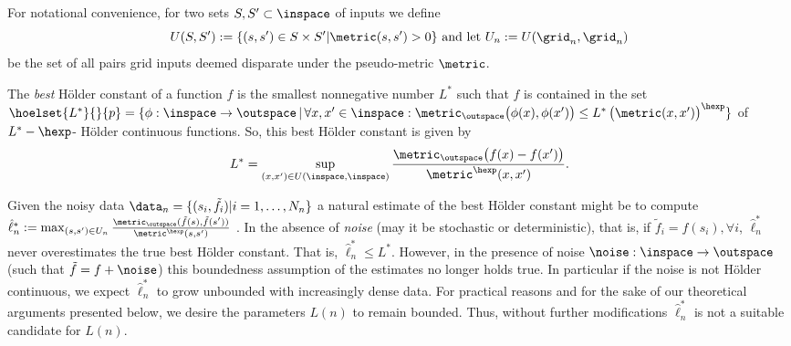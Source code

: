 For notational convenience, for two sets $S,S' \subset \inspace$ of inputs we define  $$U(S,S') := \{(s,s') \in S \times S' | \metric(s,s') >0\} \text{ and  let } U_n := U(\grid_n,\grid_n) $$ be the set of all pairs grid inputs deemed disparate under the pseudo-metric $\metric$.

The \emph{best} H\"older constant of a function $f$ is the smallest nonnegative number $L^*$ such that $f$ is contained in the set 
$\hoelset {L^*}{}{p} = \{\phi: \inspace \to \outspace \, \vert \, \forall x,x' \in \inspace : \metric_\outspace \bigl(\phi(x),\phi(x')\bigr) \leq L^* \, \bigl( \metric (x,x') \bigr)^\hexp\} $ of $L^*-\hexp$- H\"older continuous functions. So, this best H\"older constant is given by  
%
$$L^* = \sup_{(x,x') \in U(\inspace,\inspace)} \frac{\metric_\outspace \bigl(f(x) - f(x')\bigr)}{\metric^\hexp(x,x') }.$$




Given the noisy data $\data_n = \{(s_i,\tilde f_i) | i=1,\ldots,N_n\}$ a natural estimate of the best H\"older constant might be to compute $\hat \ell_n^* := \max_{(s,s') \in U_n} \frac{\metric_\outspace(\tilde f(s),\tilde f(s')) }{\metric^\hexp(s,s')}$ \cite{Strongin1973}. In the absence of \emph{noise} (may it be stochastic or deterministic), that is, if $\tilde f_i = f(s_i),\forall i$, $\hat \ell_n^*$ never overestimates the true best H\"older constant. That is, $\hat \ell_n^* \leq L^*$. However, in the presence of noise $\noise: \inspace \to \outspace$ (such that $\tilde f = f+ \noise$) this boundedness assumption of the estimates no longer holds true. In particular if the noise is not H\"older continuous, we expect $\hat \ell_n^*$ to grow unbounded with increasingly dense data.
For practical reasons and for the sake of our theoretical arguments presented below, we desire the parameters $L(n)$ to remain bounded. Thus, without further modifications $\hat \ell_n^*$ is not a suitable candidate for $L(n)$.

